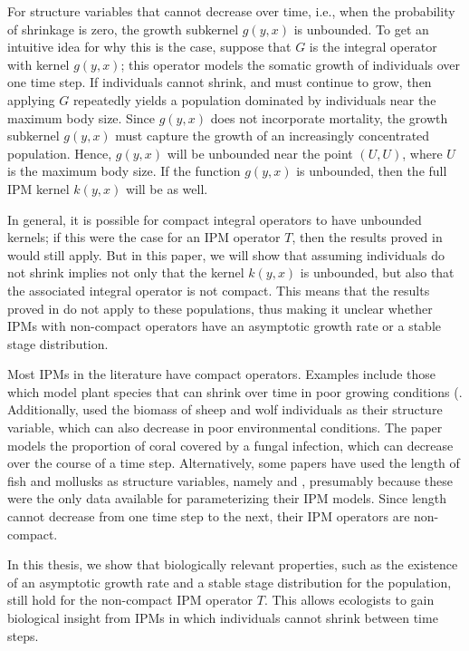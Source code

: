For structure variables that cannot decrease over time, i.e., when the probability of shrinkage is zero, the growth subkernel $g(y, x)$ is unbounded. To get an intuitive idea for why this is the case, suppose that $G$ is the integral operator with kernel $g(y, x)$; this operator models the somatic growth of individuals over one time step. If individuals cannot shrink, and must continue to grow, then applying $G$ repeatedly yields a population dominated by individuals near the maximum body size. Since $g(y, x)$ does not incorporate mortality, the growth subkernel $g(y, x)$ must capture the growth of an increasingly concentrated population. Hence, $g(y, x)$ will be unbounded near the point $(U, U)$, where $U$ is the maximum body size. If the function $g(y, x)$ is unbounded, then the full IPM kernel $k(y, x)$ will be as well. 

In general, it is possible for compact integral operators to have unbounded kernels; if this were the case for an IPM operator $T$, then the results proved in \cite{Ellner2006} would still apply. But in this paper, we will show that assuming individuals do not shrink implies not only that the kernel $k(y, x)$ is unbounded, but also that the associated integral operator is not compact. This means that the results proved in \cite{Ellner2006} do not apply to these populations, thus making it unclear whether IPMs with non-compact operators have an asymptotic growth rate or a stable stage distribution.

Most IPMs in the literature have compact operators. Examples include those which model plant species that can shrink over time in poor growing conditions (\cite{Childs2003, Eager2013, Hegland2010, Jacquemyn2010, Miller2012, Tenhumberg2015, Rees2002}.  Additionally, \cite{Childs2011, Ellner2016, Coulson2011} used the biomass of sheep and wolf individuals as their structure variable, which can also decrease in poor environmental conditions. The paper \cite{Bruno2011} models the proportion of coral covered by a fungal infection, which can decrease over the course of a time step. Alternatively, some papers have used the length of fish and mollusks as structure variables, namely \cite{Aalto2019, Ohlberger2020, Stubberud2019, Vindenes2014} and \cite{Vindenes2015}, presumably because these were the only data available for parameterizing their IPM models. Since length cannot decrease from one time step to the next, their IPM operators are non-compact.

In this thesis, we show that biologically relevant properties, such as the existence of an asymptotic growth rate and a stable stage distribution for the population, still hold for the non-compact IPM operator $T$. This allows ecologists to gain biological insight from IPMs in which individuals cannot shrink between time steps.

